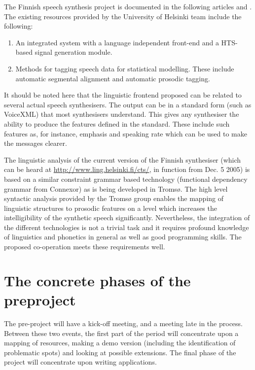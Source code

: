 \documentclass[a4paper,english]{article}
\begin{document}
The Finnish speech synthesis project is documented in the following articles \cite{specom05} and \cite{HLT}.  The existing resources provided by the University of Helsinki team include the following:

\begin{enumerate}
 \item An integrated system with a language independent front-end and a HTS-based signal generation module.
 \item Methods for tagging speech data for statistical modelling.  These include automatic segmental alignment and automatic prosodic tagging. 
\end{enumerate}

It should be noted here that the linguistic frontend proposed can be related to several actual speech synthesisers.  The output can be in a standard form (such as VoiceXML) that most synthesisers understand.  This gives any synthesiser the ability to produce the features defined in the standard. These include such features as, for instance, emphasis and speaking rate which can be used to make the messages clearer.

The linguistic analysis of the current version of the Finnish synthesiser (which can be heard at \url{http://www.ling.helsinki.fi/cts/}, in function from Dec. 5 2005) is based on a similar constraint grammar based technology (functional dependency grammar from Connexor) as is being developed in Tromsø.  The high level syntactic analysis provided by the Tromsø group enables the mapping of linguistic structures to prosodic features on a level which increases the intelligibility of the synthetic speech significantly.  Nevertheless, the integration of the different technologies is not a trivial task and it requires profound knowledge of linguistics and phonetics in general as well as good programming skills.  The proposed co-operation meets these requirements well.  


\section{The concrete phases of the preproject}


The pre-project will have a kick-off meeting, and a meeting late in the process. Between these two events, the first part of the period will concentrate upon a mapping of resources, making a demo version (including the identification of problematic spots) and looking at possible extensions. The final phase of the project will concentrate upon writing applications.
\end{document}
